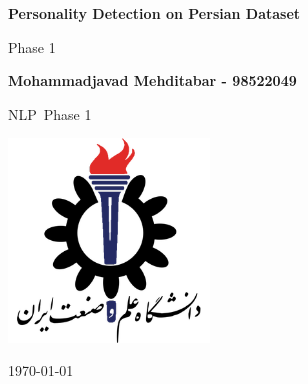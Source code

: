 \documentclass[10pt, a4paper]{article}
\newcommand\course{NLP}                            %
\newcommand\hwnumber{1}                                 %
\newcommand\Information{Mohammadjavad Mehditabar - 98522049}                        %
\begin{document}
\begin{titlepage}
    \begin{center}
        \vspace*{3cm}

        \Huge
        \textbf{Personality Detection on Persian Dataset}

        \vspace{1cm}
        \huge
        Phase \hwnumber

        \vspace{1.5cm}
        \Large

        \textbf{\Information}                      %


        \vfill

        \course \ Phase \hwnumber

        \vspace{1cm}

        \includegraphics[width=0.4\textwidth]{images/iust-logo.png}
        \\

        \Large

        \today

    \end{center}
\end{titlepage}

\newpage

\vspace*{0.1cm}

\tableofcontents
\newpage
\end{document}
